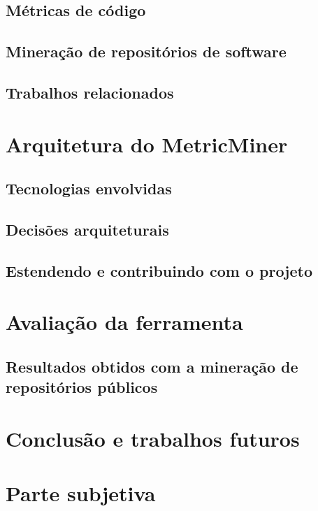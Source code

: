 \documentclass[a4paper, 12pt, twoside]{book}
\begin{document}
    \section{Métricas de código}
    
    \section{Mineração de repositórios de software}

    \section{Trabalhos relacionados}
    
\chapter{Arquitetura do MetricMiner}

    \section{Tecnologias envolvidas}
    
    \section{Decisões arquiteturais}
    
    \section{Estendendo e contribuindo com o projeto}
    
\chapter{Avaliação da ferramenta}

    \section{Resultados obtidos com a mineração de repositórios públicos}

\chapter{Conclusão e trabalhos futuros}

\chapter{Parte subjetiva}
\end{document}
